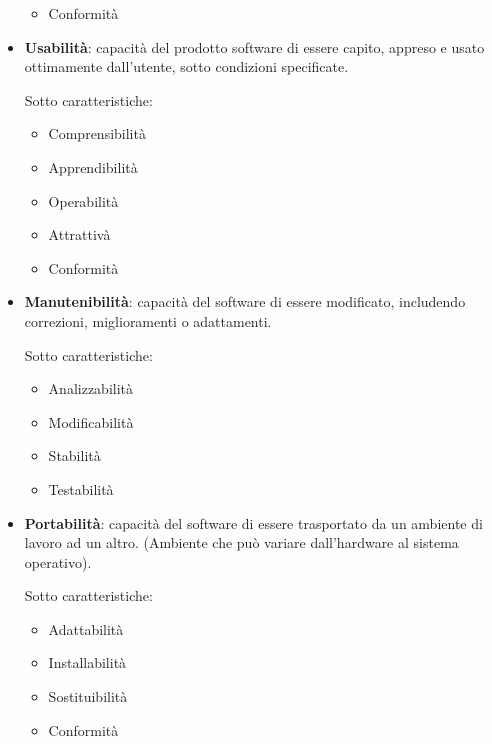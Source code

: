 \begin{itemize}
\begin{itemize}
				\item Conformità
				
			\end{itemize}

		\item \textbf{Usabilità}: capacità del prodotto software di essere capito, appreso e usato ottimamente dall'utente, sotto condizioni specificate.
		
			Sotto caratteristiche:
			
			\begin{itemize}
			
				\item Comprensibilità

				\item Apprendibilità

				\item Operabilità

				\item Attrattivà

				\item Conformità

			\end{itemize}

		\item \textbf{Manutenibilità}: capacità del software di essere modificato, includendo correzioni, miglioramenti o adattamenti.
		
			Sotto caratteristiche:
		
			\begin{itemize}
			
				\item Analizzabilità

				\item Modificabilità

				\item Stabilità

				\item Testabilità
				
			\end{itemize}

		\item \textbf{Portabilità}: capacità del software di essere trasportato da un ambiente di lavoro ad un altro. (Ambiente che può variare dall'hardware al sistema operativo).
		
			Sotto caratteristiche:
			
			\begin{itemize}
			
				\item Adattabilità

				\item Installabilità

				\item Sostituibilità
				
				\item Conformità
				
			\end{itemize}
			
		\end{itemize}
		
